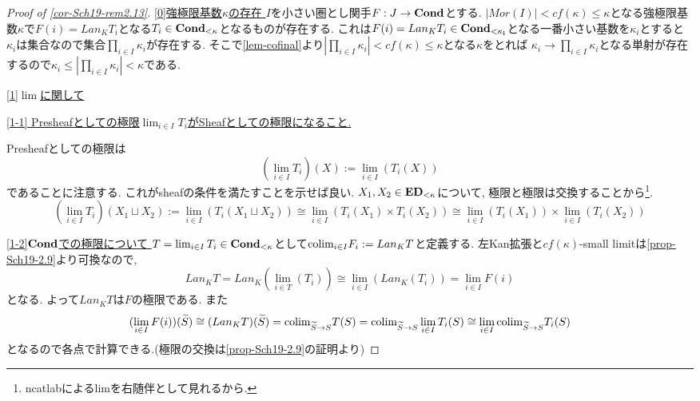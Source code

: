 \documentclass[dvipdfmx,a4paper,11pt]{article}
\newcommand{\colim}{{\rm colim}}
\theoremstyle{definition}
\begin{document}
\begin{proof}[Proof of \ref{cor-Sch19-rem2.13}]

\underline{[0]強極限基数$\kappa$の存在 }
$I$を小さい圏とし関手$F : J \to {\bf Cond}$とする.
$|Mor(I)| < cf(\kappa) \le \kappa$となる強極限基数$\kappa$で$F(i) = Lan_{K}T_i$となる$T_i \in {\bf Cond_{<\kappa}}$となるものが存在する.
これは$F(i) = Lan_{K}T_i \in {\bf Cond_{< \kappa_i}}$となる一番小さい基数を$\kappa_i$とすると
$\kappa_i$は集合なので集合$\prod_{i \in I}\kappa_i$が存在する. 
そこで\ref{lem-cofinal}より$|\prod_{i \in I}\kappa_i| < cf(\kappa) \le \kappa$となる$\kappa$をとれば
$\kappa_i \to \prod_{i \in I}\kappa_i$となる単射が存在するので$\kappa_i \le |\prod_{i \in I}\kappa_i| < \kappa$である. 

\underline{ [1]$\lim$に関して }

\underline{ [1-1] Presheafとしての極限$\lim_{i \in I}T_i$がSheafとしての極限になること.}

Presheafとしての極限は
$$
(\lim_{i \in I}T_i)(X):=\lim_{i \in I}(T_{i}(X))
$$
であることに注意する. これがsheafの条件を満たすことを示せば良い.
$X_1, X_2 \in {\bf ED}_{< \kappa}$について, 極限と極限は交換することから\footnote{ncatlabによるlimを右随伴として見れるから.}.
$$
(\lim_{i \in I}T_i)(X_1 \sqcup  X_2 ) 
:= \lim_{i \in I}(T_i(X_1\sqcup X_2))
\cong 
\lim_{i \in I}(T_i(X_1)\times T_i( X_2))
\cong
\lim_{i \in I}(T_i(X_1))\times \lim_{i \in I}(T_i( X_2))
$$

 \underline{ [1-2]${\bf Cond}$での極限について }
 $T = \lim_{i \in I}T_i \in {\bf Cond}_{< \kappa}$として$\colim_{i \in I}F_i := Lan_{K}T$と定義する.
 左Kan拡張と$cf(\kappa)$-small limitは\ref{prop-Sch19-2.9}より可換なので, 
 $$
 Lan_{K}T=Lan_K(\lim_{i \in T}(T_i))\cong \lim_{i \in I}(Lan_{K}(T_i))
 =\lim_{i \in I}F(i)
 $$
 となる. よって$ Lan_{K}T$は$F$の極限である. 
  また
 $$
 (\lim_{i \in I}F(i))(\widetilde{S})
 \cong
  (Lan_{K}T)(\widetilde{S})
  =\colim_{\widetilde{S} \to S}T(S)
  =\colim_{\widetilde{S} \to S} \lim_{i \in I}T_i(S)
  \cong
   \lim_{i \in I} \colim_{\widetilde{S} \to S} T_i(S)
 $$
 となるので各点で計算できる.(極限の交換は\ref{prop-Sch19-2.9}の証明より)
 

\end{proof}
\end{document}
